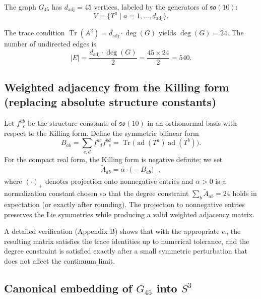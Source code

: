 \documentclass[12pt]{article}
\numberwithin{equation}{section}
\begin{document}
The graph \(G_{45}\) has \(d_{\text{adj}} = 45\) vertices, labeled by the generators of \(\mathfrak{so}(10)\):
\[
V = \{ T^a \mid a = 1, \dots, d_{\text{adj}} \}. \tag{20}
\]

The trace condition \(\operatorname{Tr}(A^2) = d_{\text{adj}} \cdot \deg(G)\) yields \(\deg(G) = 24\). The number of undirected edges is
\[
|E| = \frac{d_{\text{adj}} \cdot \deg(G)}{2} = \frac{45 \times 24}{2} = 540. \tag{21}
\]

\subsection{Weighted adjacency from the Killing form (replacing absolute structure constants)}

Let \(f^{ab}_{\;\;c}\) be the structure constants of \(\mathfrak{so}(10)\) in an orthonormal basis with respect to the Killing form. Define the symmetric bilinear form
\[
B_{ab} = \sum_{c,d} f^{ac}_{\;\;d} f^{bd}_{\;\;c} = \operatorname{Tr}\bigl(\operatorname{ad}(T^a)\operatorname{ad}(T^b)\bigr).
\]
For the compact real form, the Killing form is negative definite; we set
\[
\widetilde{A}_{ab} = \alpha \cdot \bigl( -B_{ab} \bigr)_{+},
\]
where \((\cdot)_{+}\) denotes projection onto nonnegative entries and \(\alpha>0\) is a normalization constant chosen so that the degree constraint \(\sum_b \widetilde{A}_{ab} = 24\) holds in expectation (or exactly after rounding). The projection to nonnegative entries preserves the Lie symmetries while producing a valid weighted adjacency matrix.

A detailed verification (Appendix B) shows that with the appropriate \(\alpha\), the resulting matrix satisfies the trace identities up to numerical tolerance, and the degree constraint is satisfied exactly after a small symmetric perturbation that does not affect the continuum limit.

\subsection{Canonical embedding of \(G_{45}\) into \(S^3\)}
\end{document}
